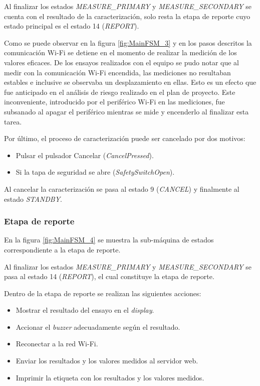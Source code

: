 Al finalizar los estados \textit{MEASURE\_PRIMARY} y \textit{MEASURE\_SECONDARY} se cuenta con el resultado de la caracterización, solo resta la etapa de reporte cuyo estado principal es el estado 14 (\textit{REPORT}). 

Como se puede observar en la figura \ref{fig:MainFSM_3} y en los pasos descritos la comunicación Wi-Fi se detiene en el momento de realizar la medición de los valores eficaces. De los ensayos realizados con el equipo se pudo notar que al medir con la comunicación Wi-Fi encendida, las mediciones no resultaban estables e inclusive se observaba un desplazamiento en ellas. Esto es un efecto que fue anticipado en el análisis de riesgo realizado en el plan de proyecto. Este inconveniente, introducido por el periférico Wi-Fi en las mediciones, fue subsanado al apagar el periférico mientras se mide y encenderlo al finalizar esta tarea.

Por último, el proceso de caracterización puede ser cancelado por dos motivos: 
\begin{itemize}
 	\item Pulsar el pulsador Cancelar (\textit{CancelPressed}).
	\item Si la tapa de seguridad se abre (\textit{SafetySwitchOpen}).	
\end{itemize}
Al cancelar la caracterización se pasa al estado 9 (\textit{CANCEL}) y finalmente al estado \textit{STANDBY}.

\subsubsection{Etapa de reporte}
\label{subsubsec:EtRep}

En la figura \ref{fig:MainFSM_4} se muestra la sub-máquina de estados correspondiente a la etapa de reporte. 

Al finalizar los estados \textit{MEASURE\_PRIMARY} y \textit{MEASURE\_SECONDARY} se pasa al estado 14 (\textit{REPORT}), el cual constituye la etapa de reporte.

Dentro de la etapa de reporte se realizan las siguientes acciones:
\begin{itemize}
\item Mostrar el resultado del ensayo en el \textit{display}.
\item Accionar el \textit{buzzer} adecuadamente según el resultado.
\item Reconectar a la red Wi-Fi.
\item Enviar los resultados y los valores medidos al servidor web.
\item Imprimir la etiqueta con los resultados y los valores medidos.
\end{itemize}

